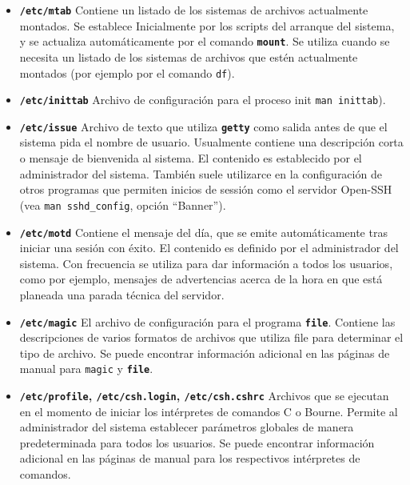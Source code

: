 \documentclass[12pt]{article}
\begin{document}
\begin{itemize}
\item \textbf{\texttt{/etc/mtab}}
Contiene un listado de los sistemas de archivos
actualmente montados. Se establece Inicialmente por los scripts del
arranque del sistema, y se actualiza automáticamente por el comando
\texttt{\textbf{mount}}. Se utiliza cuando se necesita un listado de
los sistemas de archivos que estén actualmente montados (por ejemplo por
el comando \texttt{df}).  

\item \textbf{\texttt{/etc/inittab}}
Archivo de configuración para el proceso init \texttt{man inittab}).
	
\item \textbf{\texttt{/etc/issue}}
 Archivo de texto que utiliza \texttt{\textbf{getty}} como
salida antes de que el sistema pida el nombre de usuario. Usualmente
contiene una descripción corta o mensaje de bienvenida al sistema.  El
contenido es establecido por el administrador del sistema. También suele
utilizarce en la configuración de otros programas que permiten inicios 
de sessión como el servidor Open-SSH (vea \texttt{man sshd\_config}, 
opción ``Banner''). 
	
\item \textbf{\texttt{/etc/motd}}
 Contiene el mensaje del día, que se emite
automáticamente tras iniciar una sesión con éxito. El
contenido es definido por el administrador del
sistema. Con frecuencia se utiliza para dar información a todos
los usuarios, como por ejemplo, mensajes de advertencias acerca de la
hora en que está planeada una parada técnica del servidor.

\item \textbf{\texttt{/etc/magic}}
El archivo de configuración para el programa
\texttt{\textbf{file}}. Contiene las descripciones de varios formatos
de archivos que utiliza file para determinar el tipo de archivo. Se
puede encontrar información adicional en las páginas de manual
para \texttt{magic} y \texttt{\textbf{file}}.
	

	
\item \textbf{\texttt{/etc/profile},
\texttt{/etc/csh.login},
\texttt{/etc/csh.cshrc}}  Archivos
que se ejecutan en el momento de iniciar los intérpretes de comandos C o
Bourne. Permite al administrador del sistema establecer parámetros
globales de manera predeterminada para todos los usuarios. Se puede encontrar
información adicional en las páginas de manual para los respectivos
intérpretes de comandos.  



\end{itemize}
\end{document}
